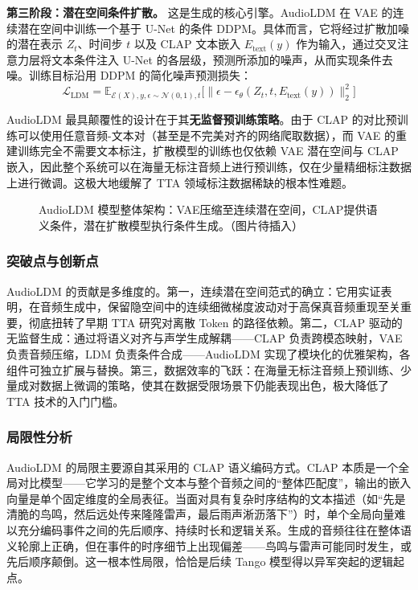 \documentclass[12pt,a4paper]{article}
\begin{document}
\textbf{第三阶段：潜在空间条件扩散。} 这是生成的核心引擎。AudioLDM 在 VAE 的连续潜在空间中训练一个基于 U-Net 的条件 DDPM。具体而言，它将经过扩散加噪的潜在表示 \(Z_t\)、时间步 \(t\) 以及 CLAP 文本嵌入 \(E_{\text{text}}(y)\) 作为输入，通过交叉注意力层将文本条件注入 U-Net 的各层级，预测所添加的噪声，从而实现条件去噪。训练目标沿用 DDPM 的简化噪声预测损失：
\begin{equation}
\mathcal{L}_{\text{LDM}} = \mathbb{E}_{\mathcal{E}(X), y, \epsilon \sim \mathcal{N}(0,1), t} \big[ \| \epsilon - \epsilon_\theta(Z_t, t, E_{\text{text}}(y)) \|_2^2 \big]
\end{equation}

AudioLDM 最具颠覆性的设计在于其\textbf{无监督预训练策略}。由于 CLAP 的对比预训练可以使用任意音频-文本对（甚至是不完美对齐的网络爬取数据），而 VAE 的重建训练完全不需要文本标注，扩散模型的训练也仅依赖 VAE 潜在空间与 CLAP 嵌入，因此整个系统可以在海量无标注音频上进行预训练，仅在少量精细标注数据上进行微调。这极大地缓解了 TTA 领域标注数据稀缺的根本性难题。

\begin{figure}[htbp]
\centering
{}
\caption{AudioLDM 模型整体架构：VAE压缩至连续潜在空间，CLAP提供语义条件，潜在扩散模型执行条件生成。（图片待插入）}
\label{fig:audioldm}
\end{figure}

\subsubsection{突破点与创新点}
AudioLDM 的贡献是多维度的。第一，连续潜在空间范式的确立：它用实证表明，在音频生成中，保留隐空间中的连续细微梯度波动对于高保真音频重现至关重要，彻底扭转了早期 TTA 研究对离散 Token 的路径依赖。第二，CLAP 驱动的无监督生成：通过将语义对齐与声学生成解耦——CLAP 负责跨模态映射，VAE 负责音频压缩，LDM 负责条件合成——AudioLDM 实现了模块化的优雅架构，各组件可独立扩展与替换。第三，数据效率的飞跃：在海量无标注音频上预训练、少量成对数据上微调的策略，使其在数据受限场景下仍能表现出色，极大降低了 TTA 技术的入门门槛。

\subsubsection{局限性分析}
AudioLDM 的局限主要源自其采用的 CLAP 语义编码方式。CLAP 本质是一个全局对比模型——它学习的是整个文本与整个音频之间的“整体匹配度”，输出的嵌入向量是单个固定维度的全局表征。当面对具有复杂时序结构的文本描述（如“先是清脆的鸟鸣，然后远处传来隆隆雷声，最后雨声淅沥落下”）时，单个全局向量难以充分编码事件之间的先后顺序、持续时长和逻辑关系。生成的音频往往在整体语义轮廓上正确，但在事件的时序细节上出现偏差——鸟鸣与雷声可能同时发生，或先后顺序颠倒。这一根本性局限，恰恰是后续 Tango 模型得以异军突起的逻辑起点。
\end{document}
